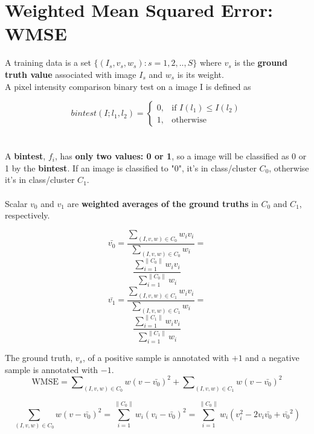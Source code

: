 \documentclass[a4paper,12pt]{article}
\begin{document}
\section{Weighted Mean Squared Error: WMSE}
A training data is a set $\{(I_s,v_s,w_s) : s=1,2,..,S\}$
where $v_s$ is the \textbf{ground truth value} associated with image $I_s$ and $w_s$ is its weight.
\\ A pixel intensity comparison binary test on a image I is defined as

\begin{equation}
\label{eq:bintest}
    bintest(I;l_1,l_2)= 
\begin{cases}
    0,		& \text{if } I(l_1)\leq I(l_2)\\
    1,      & \text{otherwise}
\end{cases}
\end{equation}\\
\\ A \textbf{bintest}, $f_i$, has \textbf{only two values: 0 or 1}, so a image will be classified as 0 or 1 by the \textbf{bintest}. If an image is classified to "0", it's in class/cluster $C_0$, otherwise it's in class/cluster $C_1$. \\
\\ Scalar $v_0$ and $v_1$ are \textbf{weighted averages of the ground truths} in $C_0$ and $C_1$, respectively.

\begin{equation}
\label{eq:WAGT0}
\bar{v_0}=\frac{\sum\nolimits_{(I,v,w) \in C_0} w_i v_i} { \sum\nolimits_{(I,v,w) \in C_0} w_i} =
\end{equation}
\[
\frac{\sum_{i=1}^{\| C_0 \|}  w_i v_i}
{\sum_{i=1}^{\| C_0 \|}  w_i}
\]
\begin{equation}
\label{eq:WAGT1}
\bar{v_1}=\frac{\sum\nolimits_{(I,v,w) \in C_1} w_i v_i} { \sum\nolimits_{(I,v,w) \in C_1} w_i}=
\end{equation}
\[
\frac{\sum_{i=1}^{\| C_1 \|}  w_i v_i}
{\sum_{i=1}^{\| C_1 \|}  w_i}
\]

The ground truth, $v_s$, of a positive sample is annotated with $+1$ and 
a negative sample is annotated with $-1$.\\


\begin{equation}
\label{eq:WMSE}
\text{WMSE}=
\sum\nolimits_{(I,v,w) \in C_0} w (v-\bar{v_0})^2 + 
\sum\nolimits_{(I,v,w) \in C_1} w (v-\bar{v_0})^2
\end{equation}

\[\sum_{(I,v,w) \in C_0} w (v-\bar{v_0})^2=\sum_{i=1}^{\| C_0 \|} w_i (v_i - \bar{v_0})^2=
\sum_{i=1}^{\| C_0 \|} w_i (v_i^2 - 2v_i \bar{v_0} + \bar{v_0}^2)\]\\
\end{document}
